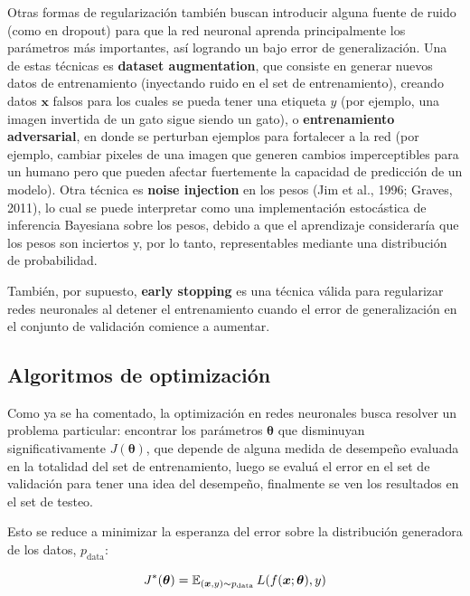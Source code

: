 Otras formas de regularizaci\'on tambi\'en buscan 
introducir alguna fuente de ruido (como en dropout) para que la red neuronal aprenda principalmente los par\'ametros m\'as importantes, as\'i logrando un bajo error de generalizaci\'on. Una de estas t\'ecnicas es \textbf{dataset augmentation}, que consiste en generar nuevos datos de entrenamiento (inyectando ruido en el set de entrenamiento), creando datos $\bm{x}$ falsos para los cuales se pueda tener una etiqueta $y$ (por ejemplo, una imagen invertida de un gato sigue siendo un gato), o \textbf{entrenamiento adversarial}, en donde se perturban ejemplos para fortalecer a la red (por ejemplo, cambiar pixeles de una imagen que generen cambios imperceptibles para un humano pero que pueden afectar fuertemente la capacidad de predicci\'on de un modelo). Otra t\'ecnica es \textbf{noise injection} en los pesos (Jim et al., 1996; Graves, 2011), lo cual se puede interpretar como una implementaci\'on estoc\'astica de inferencia Bayesiana sobre los pesos, debido a que el aprendizaje considerar\'ia que los pesos son inciertos y, por lo tanto, representables mediante una distribuci\'on de probabilidad.

Tambi\'en, por supuesto, \textbf{early stopping} es una t\'ecnica v\'alida para regularizar redes neuronales al detener el entrenamiento cuando el error de generalización en el conjunto de validación comience a aumentar.  

\subsection{Algoritmos de optimización}

Como ya se ha comentado, la optimizaci\'on en redes neuronales busca resolver un problema particular: encontrar los par\'ametros $\bm{\theta}$ que disminuyan significativamente $J(\bm{\theta})$, que depende de alguna medida de desempe{\~{n}}o evaluada en la totalidad del set de entrenamiento, luego se evaluá el error en el set de validaci\'on para tener una idea del desempeño, finalmente se ven los resultados en el set de testeo. 

Esto se reduce a minimizar la esperanza del error sobre la distribuci\'on generadora de los datos, $p_{\textrm{data}}$:


\begin{equation}
J^{*}(\bm{\theta}) = \operatorname{\mathbb{E}}_{(\bm{x},y)\sim {p}_{\textrm{data}}}L(f(\bm{x};\bm{\theta}),y)
\end{equation}


